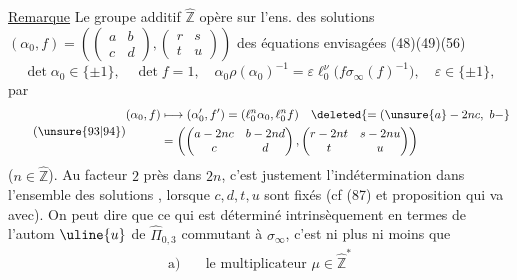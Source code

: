 

\uline{Remarque} Le groupe additif $\widehat{\mathbb Z}$ opère sur l'ens.
des solutions
$(\alpha_0,f)=\left(\begin{pmatrix}a&b\\c&d\end{pmatrix},
\begin{pmatrix}r&s\\t&u\end{pmatrix}\right)$
des équations envisagées (48)(49)(56)
\[
\tag{93}
\det\alpha_0\in\{\pm1\},\quad\det f=1,\quad
\alpha_0\rho(\alpha_0)^{-1}
=\varepsilon\ell_0^{\nu}\bigl(f\sigma_\infty(f)^{-1}\bigr),
\quad\varepsilon\in\{\pm1\},
\]
par
\[
\tag{\unsure{93|94}}
\begin{aligned}
(\alpha_0,f)&\longmapsto(\alpha'_0,f')
=(\ell_0^n\alpha_0,\ell_0^nf)\quad\deleted{=(\unsure{a}-2nc,\ b-}\\
&=\left(\begin{pmatrix}a-2nc&b-2nd\\c&d\end{pmatrix},
\begin{pmatrix}r-2nt&s-2nu\\t&u\end{pmatrix}\right)
\end{aligned}
\]
($n\in\widehat{\mathbb Z}$).
Au facteur $2$ près dans $2n$, c'est justement l'indétermination dans
 l'ensemble des solutions , lorsque
$c,d,t,u$ sont fixés (cf (87) et proposition qui va avec).
On peut  dire que ce qui est déterminé
intrinsèquement 
en termes de l'autom  $\uline{u}$ de
$\widehat{\Pi}_{0,3}$ commutant à $\sigma_\infty$, c'est ni plus ni moins
que 
\[
\tag{95}
\begin{aligned}
\text{a)}\quad&\text{le multiplicateur }\mu\in\widehat{\mathbb Z}^{*}
\end{aligned}
\]

